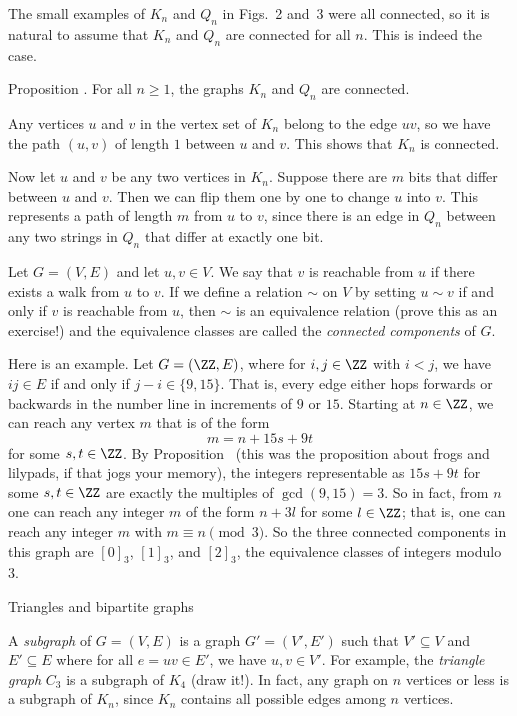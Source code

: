 The small examples of $K_n$ and $Q_n$ in Figs.~2 and~3 were all connected,
so it is natural to assume that $K_n$ and $Q_n$ are connected for all $n$.
This is indeed the case.

\proclaim Proposition \advthm. For all $n\ge 1$, the graphs $K_n$ and $Q_n$
are connected.

\proof Any vertices $u$ and $v$ in the vertex set of $K_n$ belong to the
edge $uv$, so we have the path $(u, v)$ of length $1$ between $u$ and $v$.
This shows that $K_n$ is connected.

Now let $u$ and $v$ be any two vertices in $K_n$. Suppose there are $m$
bits that differ between $u$ and $v$. Then we can flip them one by one to
change $u$ into $v$. This represents a path of length $m$ from $u$ to $v$, since there
is an edge in $Q_n$ between any two strings in $Q_n$ that differ at exactly one
bit.\slug

Let $G = (V,E)$ and
let $u,v\in V$. We say that {$v$ is reachable from $u$} if there exists a walk
from $u$ to $v$. If we define a relation $\sim$ on $V$ by setting
$u\sim v$ if and only if $v$ is reachable from $u$, then $\sim$ is an equivalence
relation (prove this as an exercise!) and the equivalence
classes are called the {\it connected components} of $G$.

Here is an example. Let $G = (\ZZ, E)$, where for $i,j\in \ZZ$ with $i<j$, we have
$ij\in E$ if and only if $j-i \in \{9,15\}$. That is, every edge either
hops forwards or backwards in the number line in increments of $9$ or $15$.
Starting at $n\in \ZZ$, we can reach any vertex $m$ that is of the form
$$ m = n + 15s + 9t$$
for some $s,t\in \ZZ$. By Proposition~{\propfrogs} (this was the proposition
about frogs and lilypads, if that jogs your memory), the integers
representable
as $15s+9t$ for some $s,t\in \ZZ$ are exactly the multiples of
$\gcd(9,15) = 3$. So in fact, from $n$ one can reach any integer $m$
of the form $n+3l$ for some $l\in \ZZ$; that is, one can reach any integer
$m$ with $m\equiv n\pmod 3$. So the three connected components in this
graph are $[0]_3$, $[1]_3$, and $[2]_3$, the equivalence classes of integers
modulo $3$.

\advsect Triangles and bipartite graphs

A {\it subgraph} of $G = (V,E)$ is a graph $G' = (V',E')$ such that
$V'\subseteq V$ and $E'\subseteq E$ where for all $e = uv\in E'$, we have
$u,v\in V'$. For example, the {\it triangle graph} $C_3$ is a subgraph of $K_4$ (draw it!).
In fact, any graph on $n$ vertices or less is a subgraph of $K_n$, since
$K_n$ contains all possible edges among $n$ vertices.

